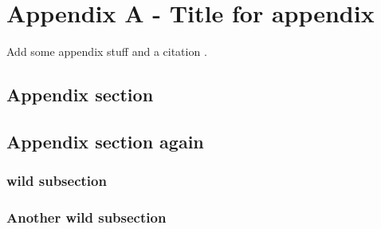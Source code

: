 \chapter{Appendix A - Title for appendix}
\label{appendix-a:title}
Add some appendix stuff and a citation \cite{citation1}.
\lipsum[1-2]
\section{Appendix section}
\lipsum[1-1]
\section{Appendix section again}
\lipsum[1-1]
\subsection{wild subsection}
\lipsum[1-1]
\subsection{Another wild subsection}
\lipsum[1-1]